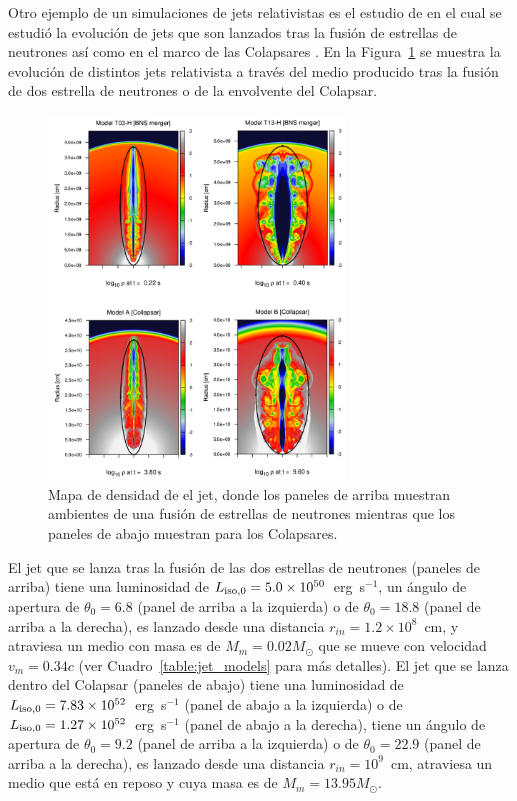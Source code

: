 \documentclass[12pt,a4paper]{book}
\begin{document}
Otro ejemplo de un simulaciones de jets relativistas es el estudio de \cite{JBEMGRB} en el cual se estudió la evolución de jets que son lanzados tras la fusión de estrellas de neutrones así como en el 
marco de las Colapsares \cite{JBEMGRB}. 
En la Figura~\ref{fig:jet_models} se muestra la evolución de distintos jets relativista a través del medio producido tras la fusión de dos estrella de neutrones o de la envolvente del Colapsar. 
\begin{figure} 
  \centering
    \includegraphics[width=0.7\textwidth]{Figuras/Introduccion/jet_models.png}
  \caption{Mapa de densidad de el jet, donde los paneles de arriba muestran ambientes de una fusión de estrellas de neutrones mientras que los paneles de abajo muestran para los Colapsares.}
  \label{fig:jet_models}
\end{figure}

{\color{blue} El jet que se lanza tras la fusión de las dos estrellas de neutrones (paneles de arriba) tiene una luminosidad de $L_{\rm iso, 0} = 5.0 \times10^{50}$~erg~s$^{-1}$, 
un ángulo de apertura de $\theta_0=6.8$ (panel de arriba a la izquierda) o de $\theta_0=18.8$ (panel de arriba a la derecha), 
es lanzado desde una distancia $r_{in}=1.2\times10^{8}$~cm, y atraviesa un medio con masa es de $M_{m} = 0.02 M_{\odot}$ que se mueve con velocidad $v_{m} = 0.34 c$ (ver Cuadro~\ref{table:jet_models} 
para más detalles). El jet que se lanza dentro del Colapsar (paneles de abajo) tiene una luminosidad de $L_{\rm iso, 0} = 7.83 \times10^{52}$~erg~s$^{-1}$ (panel de abajo a la izquierda) o 
de $L_{\rm iso, 0} = 1.27 \times10^{52}$~erg~s$^{-1}$ (panel de abajo a la derecha), tiene un ángulo de apertura de $\theta_0=9.2$ (panel de arriba a la izquierda) o de $\theta_0=22.9$ (panel de arriba a la derecha), 
es lanzado desde una distancia $r_{in}=10^{9}$~cm, atraviesa un medio que está en reposo y cuya masa es de $M_{m} = 13.95 M_{\odot}$.}
\end{document}
